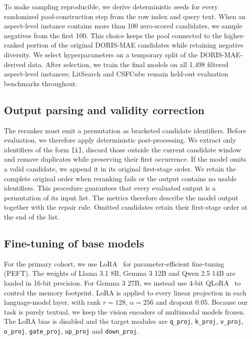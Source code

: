\documentclass[pdflatex,sn-basic,Numbered]{sn-jnl}%
\theoremstyle{thmstyleone}%
\theoremstyle{thmstyletwo}%
\theoremstyle{thmstylethree}%
\begin{document}
To make sampling reproducible, we derive deterministic seeds for every randomized
pool-construction step from the row index and query text. When an aspect-level
instance contains more than 100 zero-scored candidates, we sample negatives from
the first 100. This choice keeps the pool connected to the higher-ranked portion
of the original DORIS-MAE candidates while retaining negative diversity. We
select hyperparameters on a temporary split of the DORIS-MAE-derived data. After
selection, we train the final models on all 1,498 filtered aspect-level instances;
LitSearch and CSFCube remain held-out evaluation benchmarks throughout.

\subsection{Output parsing and validity correction}
\label{supp:output-parsing}

The reranker must emit a permutation as bracketed candidate identifiers. Before
evaluation, we therefore apply deterministic post-processing. We extract only
identifiers of the form \texttt{[i]}, discard those outside the current candidate
window and remove duplicates while preserving their first occurrence. If the
model omits a valid candidate, we append it in its original first-stage order. We
retain the complete original order when reranking fails or the output contains no
usable identifiers. This procedure guarantees that every evaluated output is a
permutation of its input list. The metrics therefore describe the model output
together with the repair rule. Omitted candidates retain their first-stage order
at the end of the list.

\subsection{Fine-tuning of base models}

For the primary cohort, we use LoRA~\cite{Hu} for parameter-efficient fine-tuning
(PEFT). The weights of Llama 3.1 8B, Gemma 3 12B and Qwen 2.5 14B are loaded
in 16-bit precision. For Gemma 3 27B, we instead use 4-bit
QLoRA~\cite{Dettmers} to control the memory
footprint. LoRA is applied to every linear projection in each language-model layer,
with rank $r = 128$, $\alpha = 256$ and dropout $0.05$. Because our task is
purely textual, we keep the vision encoders of multimodal models frozen. The LoRA
bias is disabled and the target modules are \texttt{q\_proj}, \texttt{k\_proj},
\texttt{v\_proj}, \texttt{o\_proj}, \texttt{gate\_proj}, \texttt{up\_proj} and
\texttt{down\_proj}.
\end{document}
